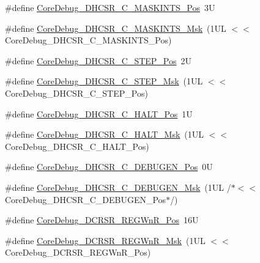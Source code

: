 \begin{DoxyCompactItemize}
\item 
\#define \hyperlink{group___c_m_s_i_s___core_debug_ga0d2907400eb948a4ea3886ca083ec8e3}{Core\-Debug\-\_\-\-D\-H\-C\-S\-R\-\_\-\-C\-\_\-\-M\-A\-S\-K\-I\-N\-T\-S\-\_\-\-Pos}~3\-U
\item 
\#define \hyperlink{group___c_m_s_i_s___core_debug_ga77fe1ef3c4a729c1c82fb62a94a51c31}{Core\-Debug\-\_\-\-D\-H\-C\-S\-R\-\_\-\-C\-\_\-\-M\-A\-S\-K\-I\-N\-T\-S\-\_\-\-Msk}~(1\-U\-L $<$$<$ Core\-Debug\-\_\-\-D\-H\-C\-S\-R\-\_\-\-C\-\_\-\-M\-A\-S\-K\-I\-N\-T\-S\-\_\-\-Pos)
\item 
\#define \hyperlink{group___c_m_s_i_s___core_debug_gae1fc39e80de54c0339cbb1b298a9f0f9}{Core\-Debug\-\_\-\-D\-H\-C\-S\-R\-\_\-\-C\-\_\-\-S\-T\-E\-P\-\_\-\-Pos}~2\-U
\item 
\#define \hyperlink{group___c_m_s_i_s___core_debug_gae6bda72fbd32cc5734ff3542170dc00d}{Core\-Debug\-\_\-\-D\-H\-C\-S\-R\-\_\-\-C\-\_\-\-S\-T\-E\-P\-\_\-\-Msk}~(1\-U\-L $<$$<$ Core\-Debug\-\_\-\-D\-H\-C\-S\-R\-\_\-\-C\-\_\-\-S\-T\-E\-P\-\_\-\-Pos)
\item 
\#define \hyperlink{group___c_m_s_i_s___core_debug_gaddf1d43f8857e4efc3dc4e6b15509692}{Core\-Debug\-\_\-\-D\-H\-C\-S\-R\-\_\-\-C\-\_\-\-H\-A\-L\-T\-\_\-\-Pos}~1\-U
\item 
\#define \hyperlink{group___c_m_s_i_s___core_debug_ga1d905a3aa594eb2e8bb78bcc4da05b3f}{Core\-Debug\-\_\-\-D\-H\-C\-S\-R\-\_\-\-C\-\_\-\-H\-A\-L\-T\-\_\-\-Msk}~(1\-U\-L $<$$<$ Core\-Debug\-\_\-\-D\-H\-C\-S\-R\-\_\-\-C\-\_\-\-H\-A\-L\-T\-\_\-\-Pos)
\item 
\#define \hyperlink{group___c_m_s_i_s___core_debug_gab557abb5b172b74d2cf44efb9d824e4e}{Core\-Debug\-\_\-\-D\-H\-C\-S\-R\-\_\-\-C\-\_\-\-D\-E\-B\-U\-G\-E\-N\-\_\-\-Pos}~0\-U
\item 
\#define \hyperlink{group___c_m_s_i_s___core_debug_gab815c741a4fc2a61988cd2fb7594210b}{Core\-Debug\-\_\-\-D\-H\-C\-S\-R\-\_\-\-C\-\_\-\-D\-E\-B\-U\-G\-E\-N\-\_\-\-Msk}~(1\-U\-L /$\ast$$<$$<$ Core\-Debug\-\_\-\-D\-H\-C\-S\-R\-\_\-\-C\-\_\-\-D\-E\-B\-U\-G\-E\-N\-\_\-\-Pos$\ast$/)
\item 
\#define \hyperlink{group___c_m_s_i_s___core_debug_ga51e75942fc0614bc9bb2c0e96fcdda9a}{Core\-Debug\-\_\-\-D\-C\-R\-S\-R\-\_\-\-R\-E\-G\-Wn\-R\-\_\-\-Pos}~16\-U
\item 
\#define \hyperlink{group___c_m_s_i_s___core_debug_ga1eef4992d8f84bc6c0dffed1c87f90a5}{Core\-Debug\-\_\-\-D\-C\-R\-S\-R\-\_\-\-R\-E\-G\-Wn\-R\-\_\-\-Msk}~(1\-U\-L $<$$<$ Core\-Debug\-\_\-\-D\-C\-R\-S\-R\-\_\-\-R\-E\-G\-Wn\-R\-\_\-\-Pos)
\item 

\end{DoxyCompactItemize}
